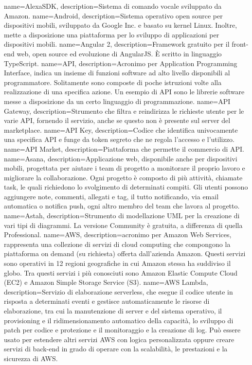 \hypertarget{A}{}

{
	name=AlexaSDK,
	description={Sistema di comando vocale sviluppato da Amazon.}
}
{
	name=Android,
	description={Sistema operativo open source per dispositivi mobili, sviluppato da Google Inc. e basato su kernel Linux. Inoltre, mette a disposizione una piattaforma per lo sviluppo di applicazioni per dispositivi mobili.}
}
{
	name=Angular 2,
	description={Framework gratuito per il front-end web, open source ed evoluzione di AngularJS. \MakeUppercase{è} scritto in linguaggio TypeScript.}
}
{
	name=API,
	description={Acronimo per Application Programming Interface, indica un insieme di funzioni software ad alto livello disponibili al programmatore. Solitamente sono composte di poche istruzioni volte alla realizzazione di una specifica azione. Un esempio di API sono le librerie software messe a disposizione da un certo linguaggio di programmazione.}
}
{
	name=API Gateway,
	description={Strumento che filtra e reindirizza le richieste utente per le varie API, fornendo il servizio, anche se questo non è presente sul server del marketplace.}
}
{
	name=API Key,
	description={Codice che identifica univocamente una specifica API e funge da token segreto che ne regola l'accesso e l'utilizzo.}
}
{
	name=API Market,
	description={Piattaforma che permette il commercio di API.}
}
{
	name=Asana,
	description={Applicazione web, disponibile anche per dispositivi mobili, progettata per aiutare i team di progetto a monitorare il proprio lavoro e migliorare la collaborazione. Ogni progetto è composto di più attività, chiamate task, le quali richiedono lo svolgimento di determinati compiti. Gli utenti possono aggiungere note, commenti, allegati e tag, il tutto notificando, via email automatica o notifica push, ogni altro membro del team che lavora al progetto.}
}
{
	name=Astah,
	description={Strumento di modellazione UML per la creazione di vari tipi di diagrammi. La versione Community è gratuita, a differenza di quella Professional.}
}
{
	name=AWS,
	description={acronimo per Amazon Web Services, rappresenta una collezione di servizi di cloud computing che compongono la piattaforma on demand (su richiesta) offerta dall'azienda Amazon. Questi servizi sono operativi in 12 regioni geografiche in cui Amazon stessa ha suddiviso il globo. Tra questi servizi i più conosciuti sono Amazon Elastic Compute Cloud (EC2) e Amazon Simple Storage Service (S3).}
}
{
	name=AWS Lambda,
	description={Servizio di elaborazione serverless, che esegue il codice utente in risposta a determinati eventi e gestisce automaticamente le risorse di elaborazione, tra cui la manutenzione di server e del sistema operativo, il provisioning e il ridimensionamento automatico della capacità, lo sviluppo di patch per codice e protezione e il monitoraggio e la creazione di log. Può essere usato per estendere altri servizi AWS con logica personalizzata oppure creare servizi di back-end in grado di operare con la scalabilità, le prestazioni e la sicurezza di AWS.}
}

